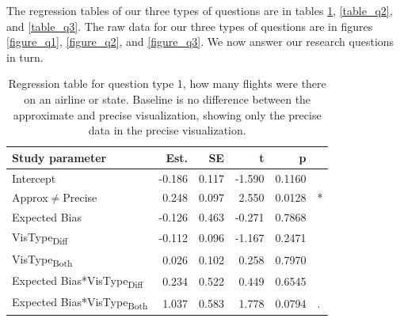 \documentclass[10pt,journal,compsoc]{IEEEtran}
\begin{document}
The regression tables of our three types of questions are in tables \ref{table_q1}, \ref{table_q2}, and \ref{table_q3}.
The raw data for our three types of questions are in figures \ref{figure_q1}, \ref{figure_q2}, and \ref{figure_q3}.
We now answer our research questions in turn.

\begin{table}[!t]
\renewcommand{\arraystretch}{1.3}
\caption{Regression table for question type 1, how many flights were there on an airline or state. Baseline is no difference between the approximate and precise visualization, showing only the precise data in the precise visualization.}
\label{table_q1}
\centering
\begin{tabular}{|l||r|r|r|r@{}l|}
\hline
Study parameter & Est. & SE & t & p & \\
\hline
\hline
Intercept & -0.186 & 0.117 & -1.590 & 0.1160 &  \\
\hline
Approx$\neq$Precise & 0.248 & 0.097 & 2.550 & 0.0128 & * \\
\hline
Expected Bias & -0.126 & 0.463 & -0.271 & 0.7868 &  \\
\hline
VisType\textsubscript{Diff} & -0.112 & 0.096 & -1.167 & 0.2471 &  \\
\hline
VisType\textsubscript{Both} & 0.026 & 0.102 & 0.258 & 0.7970 &  \\
\hline
Expected Bias*VisType\textsubscript{Diff} & 0.234 & 0.522 & 0.449 & 0.6545 &  \\
\hline
Expected Bias*VisType\textsubscript{Both} & 1.037 & 0.583 & 1.778 & 0.0794 & . \\
\hline
\end{tabular}
\end{table}
\end{document}
